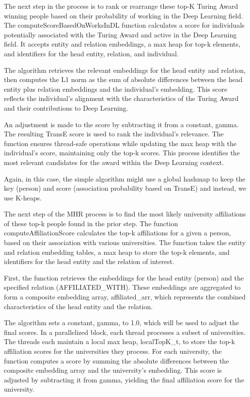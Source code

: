 \documentclass[sigconf]{acmart}
\begin{document}
The next step in the process is to rank or rearrange these top-K Turing Award winning people based on their probability of working in the Deep Learning field. The computeScoreBasedOnWorksInDL function calculates a score for individuals potentially associated with the Turing Award and active in the Deep Learning field. It accepts entity and relation embeddings, a max heap for top-k elements, and identifiers for the head entity, relation, and individual.

The algorithm retrieves the relevant embeddings for the head entity and relation, then computes the L1 norm as the sum of absolute differences between the head entity plus relation embeddings and the individual's embedding. This score reflects the individual's alignment with the characteristics of the Turing Award and their contributions to Deep Learning.

An adjustment is made to the score by subtracting it from a constant, gamma. The resulting TransE score is used to rank the individual's relevance. The function ensures thread-safe operations while updating the max heap with the individual's score, maintaining only the top-k scores. This process identifies the most relevant candidates for the award within the Deep Learning context.

Again, in this case, the simple algorithm might use a global hashmap to keep the key (person) and score (association probability based on TransE) and instead, we use K-heaps.

The next step of the MHR process is to find the most likely university affiliations of these top-k people found in the prior step. The function computeAffiliationScore calculates the top-k affiliations for a given a person, based on their association with various universities. The function takes the entity and relation embedding tables, a max heap to store the top-k elements, and identifiers for the head entity and the relation of interest.

First, the function retrieves the embeddings for the head entity (person) and the specified relation (AFFILIATED\_WITH). These embeddings are aggregated to form a composite embedding array, affiliated\_arr, which represents the combined characteristics of the head entity and the relation.

The algorithm sets a constant, gamma, to 1.0, which will be used to adjust the final scores. In a parallelized block, each thread processes a subset of universities. The threads each maintain a local max heap, localTopK\_t, to store the top-k affiliation scores for the universities they process. For each university, the function computes a score by summing the absolute differences between the composite embedding array and the university's embedding. This score is adjusted by subtracting it from gamma, yielding the final affiliation score for the university.
\end{document}
